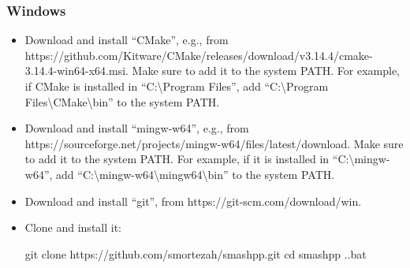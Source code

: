 \subsubsection*{Windows}
\begin{itemize}
  \item Download and install ``CMake'', e.g., from https://github.com/Kitware/CMake/releases/\linebreak download/v3.14.4/cmake-3.14.4-win64-x64.msi. Make sure to add it to the system PATH. For example, if CMake is installed in ``C:\textbackslash Program Files'', add ``C:\textbackslash Program Files\textbackslash CMake\textbackslash bin'' to the system PATH.
  \item Download and install ``mingw-w64'', e.g., from https://sourceforge.net/projects/mingw-w64/\linebreak files/latest/download. Make sure to add it to the system PATH. For example, if it is installed in ``C:\textbackslash mingw-w64'', add ``C:\textbackslash mingw-w64\textbackslash mingw64\textbackslash bin'' to the system PATH.
  \item Download and install ``git'', from https://git-scm.com/download/win.
  \item Clone \smashpp and install it:
\begin{code}[style=bash]
git clone https://github.com/smortezah/smashpp.git
cd smashpp
.\install.bat
\end{code}
\end{itemize}

